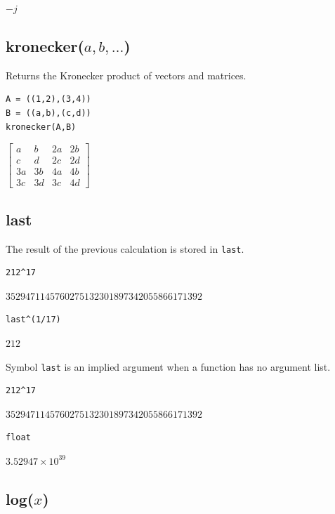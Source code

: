 \documentclass[12pt]{article}
\begin{document}
$-j$

\subsection*{kronecker($a,b,\ldots$)}

Returns the Kronecker product of vectors and matrices.

{\color{blue}
\begin{verbatim}
A = ((1,2),(3,4))
B = ((a,b),(c,d))
kronecker(A,B)
\end{verbatim}
}

$\displaystyle
\begin{bmatrix}
a & b & 2a & 2b
\\[1ex]
c & d & 2c & 2d
\\[1ex]
3a & 3b & 4a & 4b
\\[1ex]
3c & 3d & 3c & 4d
\end{bmatrix}
$

\subsection*{last}

The result of the previous calculation is stored in {\tt last}.

{\color{blue}
\begin{verbatim}
212^17
\end{verbatim}
}

$3529471145760275132301897342055866171392$

{\color{blue}
\begin{verbatim}
last^(1/17)
\end{verbatim}
}

$212$

\bigskip
Symbol \verb$last$ is an implied argument when a function has no argument list.

{\color{blue}
\begin{verbatim}
212^17
\end{verbatim}
}

$3529471145760275132301897342055866171392$

{\color{blue}
\begin{verbatim}
float
\end{verbatim}
}

$\displaystyle 3.52947\times10^{39}$

\subsection*{log($x$)}
\end{document}
